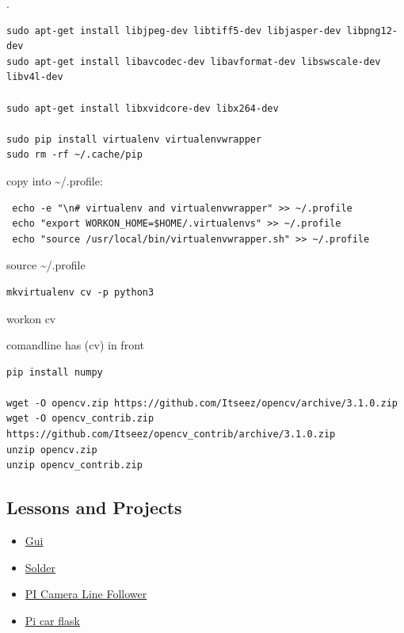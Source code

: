 .

\begin{verbatim}
sudo apt-get install libjpeg-dev libtiff5-dev libjasper-dev libpng12-dev
sudo apt-get install libavcodec-dev libavformat-dev libswscale-dev libv4l-dev

sudo apt-get install libxvidcore-dev libx264-dev

sudo pip install virtualenv virtualenvwrapper
sudo rm -rf ~/.cache/pip
\end{verbatim}

copy into \textasciitilde{}/.profile:

\begin{verbatim}
 echo -e "\n# virtualenv and virtualenvwrapper" >> ~/.profile
 echo "export WORKON_HOME=$HOME/.virtualenvs" >> ~/.profile
 echo "source /usr/local/bin/virtualenvwrapper.sh" >> ~/.profile
\end{verbatim}

source \textasciitilde{}/.profile

\begin{verbatim}
mkvirtualenv cv -p python3
\end{verbatim}

workon cv

comandline has (cv) in front

\begin{verbatim}
pip install numpy

wget -O opencv.zip https://github.com/Itseez/opencv/archive/3.1.0.zip
wget -O opencv_contrib.zip https://github.com/Itseez/opencv_contrib/archive/3.1.0.zip
unzip opencv.zip
unzip opencv_contrib.zip
\end{verbatim}

\subsection{Lessons and Projects}\label{lessons-and-projects}

\begin{itemize}
\tightlist
\item
  \href{https://www.raspberrypi.org/learning/getting-started-with-guis/worksheet/}{Gui}\\
\item
  \href{https://www.raspberrypi.org/learning/getting-started-with-guis/}{Solder}\\
\item
  \href{https://www.raspberrypi.org/blog/an-image-processing-robot-for-robocup-junior/}{PI
  Camera Line Follower}\\
\item
  \href{https://circuitdigest.com/microcontroller-projects/web-controlled-raspberry-pi-surveillance-robot}{Pi
  car flask}
\end{itemize}

